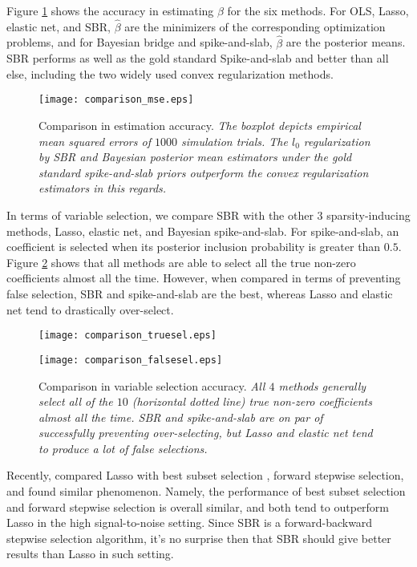 \documentclass[11pt]{article}%
\numberwithin{equation}{section}
\theoremstyle{plain}
\begin{document}
Figure \ref{fig:mse} shows the accuracy in estimating $\beta$ for the six methods.  For OLS, Lasso, elastic net, and SBR, $\hat\beta$ are the minimizers of the corresponding optimization problems, and for Bayesian bridge and spike-and-slab, $\hat\beta$ are the posterior means.  SBR performs as well as the gold standard Spike-and-slab and better than all else, including the two widely used convex regularization methods.

\begin{figure}[!htb]
    \centering
    \texttt{[image: comparison\_mse.eps]}
    \caption{Comparison in estimation accuracy.  \textit{The boxplot depicts empirical mean squared errors of $1000$ simulation trials.  The $l_0$ regularization by SBR and Bayesian posterior mean estimators under the gold standard spike-and-slab priors outperform the convex regularization estimators in this regards.}}
    \label{fig:mse}
\end{figure}

In terms of variable selection, we compare SBR with the other $3$ sparsity-inducing methods, Lasso, elastic net, and Bayesian spike-and-slab.  For spike-and-slab, an coefficient is selected when its posterior inclusion probability is greater than $0.5$.  Figure \ref{fig:varsel} shows that all methods are able to select all the true non-zero coefficients almost all the time.  However, when compared in terms of preventing false selection, SBR and spike-and-slab are the best, whereas Lasso and elastic net tend to drastically over-select.

\begin{figure}[!htb]
    \centering
   \begin{minipage}{0.49\textwidth}
     \texttt{[image: comparison\_truesel.eps]}
   \end{minipage}
   \begin {minipage}{0.49\textwidth}
     \texttt{[image: comparison\_falsesel.eps]}
   \end{minipage}
    \caption{Comparison in variable selection accuracy.  \textit{All $4$ methods generally select all of the $10$ (horizontal dotted line) true non-zero coefficients almost all the time.  SBR and spike-and-slab are on par of successfully preventing over-selecting, but Lasso and elastic net tend to produce a lot of false selections.}}
    \label{fig:varsel}
\end{figure}

Recently, \cite{hastie2017} compared Lasso with best subset selection \citep{bertsimas2016}, forward stepwise selection, and found similar phenomenon.  Namely, the performance of best subset selection and forward stepwise selection is overall similar, and both tend to outperform Lasso in the high signal-to-noise setting.  Since SBR is a forward-backward stepwise selection algorithm, it's no surprise then that SBR should give better results than Lasso in such setting.
\end{document}
